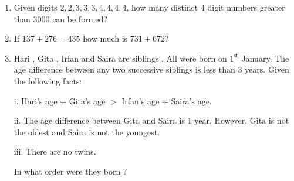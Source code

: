 \documentclass[journal,12pt,onecolumn]{IEEEtran}
\theoremstyle{remark}
\begin{document}
\begin{enumerate}
\item Given digits $2,2,3,3,3,4,4,4,4$, how many distinct $4$ digit numbers greater than $3000$ can be formed?  

\hfill{}

\begin{enumerate}
\end{enumerate}

\item If $137 + 276 = 435$ how much is $731 + 672$?  

\hfill{}

\begin{enumerate}
\end{enumerate}

\item Hari , Gita , Irfan  and Saira  are siblings . All were born on $1^{\text{st}}$ January. The age difference between any two successive siblings  is less than $3$ years. Given the following facts:  

i. Hari’s age $+$ Gita’s age $>$ Irfan’s age $+$ Saira’s age.  

ii. The age difference between Gita and Saira is $1$ year. However, Gita is not the oldest and Saira is not the youngest.  

iii. There are no twins.  

In what order were they born ?  

\hfill{}

\begin{enumerate}
\end{enumerate}


\end{enumerate}
\end{document}
